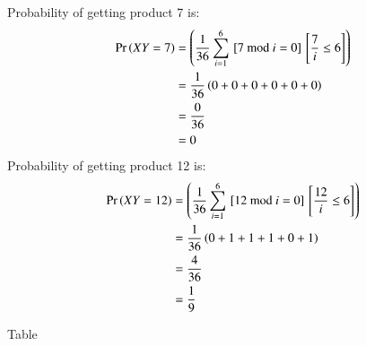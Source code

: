 \documentclass[journal,12pt,onecolumn]{IEEEtran}
\begin{document}
Probability of getting product 7 is:
\begin{align}
    \Pr\left(XY = 7\right) &= \left(\frac{1}{36}\sum_{i = 1}^{6} {}\left[7 \text{ mod } i = 0\right]{}\left[\frac{7}{i} \leq 6\right]\right) \\
    &= \frac{1}{36} \left( 0 + 0 + 0 + 0 + 0 + 0  \right) \\
    &= \frac{0}{36} \\
    &= 0 
\end{align}
Probability of getting product 12 is:
\begin{align}
    \Pr\left(XY = 12\right) &= \left(\frac{1}{36}\sum_{i = 1}^{6} {}\left[12 \text{ mod } i = 0\right]{}\left[\frac{12}{i} \leq 6\right]\right) \\
    &= \frac{1}{36} \left( 0 + 1 + 1 + 1 + 0 + 1  \right) \\
    &= \frac{4}{36} \\
    &= \frac{1}{9} 
\end{align}
\begin{table}[H]
\caption{Table}
\label{tab:ncert/10/13/3/16/}
\centering

\end{table}
  
\end{document}
